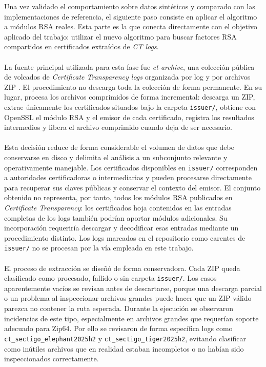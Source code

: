 Una vez validado el comportamiento sobre datos sintéticos y comparado con las implementaciones de referencia, el siguiente paso consiste en aplicar el algoritmo a módulos RSA reales. Esta parte es la que conecta directamente con el objetivo aplicado del trabajo: utilizar el nuevo algoritmo para buscar factores RSA compartidos en certificados extraídos de \textit{CT logs}.
\\
\\
La fuente principal utilizada para esta fase fue \textit{ct-archive}, una colección pública de volcados de \textit{Certificate Transparency logs} organizada por log y por archivos ZIP \citep{geomys2026ctarchive}. El procedimiento no descarga toda la colección de forma permanente. En su lugar, procesa los archivos comprimidos de forma incremental: descarga un ZIP, extrae únicamente los certificados situados bajo la carpeta \texttt{issuer/}, obtiene con OpenSSL el módulo RSA y el emisor de cada certificado, registra los resultados intermedios y libera el archivo comprimido cuando deja de ser necesario.
\\
\\
Esta decisión reduce de forma considerable el volumen de datos que debe conservarse en disco y delimita el análisis a un subconjunto relevante y operativamente manejable. Los certificados disponibles en \texttt{issuer/} corresponden a autoridades certificadoras o intermediarias y pueden procesarse directamente para recuperar sus claves públicas y conservar el contexto del emisor. El conjunto obtenido no representa, por tanto, todos los módulos RSA publicados en \textit{Certificate Transparency}: los certificados hoja contenidos en las entradas completas de los logs también podrían aportar módulos adicionales. Su incorporación requeriría descargar y decodificar esas entradas mediante un procedimiento distinto. Los logs marcados en el repositorio como carentes de \texttt{issuer/} no se procesan por la vía empleada en este trabajo.
\\
\\
El proceso de extracción se diseñó de forma conservadora. Cada ZIP queda clasificado como procesado, fallido o sin carpeta \texttt{issuer/}. Los casos aparentemente vacíos se revisan antes de descartarse, porque una descarga parcial o un problema al inspeccionar archivos grandes puede hacer que un ZIP válido parezca no contener la ruta esperada. Durante la ejecución se observaron incidencias de este tipo, especialmente en archivos grandes que requerían soporte adecuado para Zip64. Por ello se revisaron de forma específica logs como \texttt{ct\_sectigo\_elephant2025h2} y \texttt{ct\_sectigo\_tiger2025h2}, evitando clasificar como inútiles archivos que en realidad estaban incompletos o no habían sido inspeccionados correctamente.
